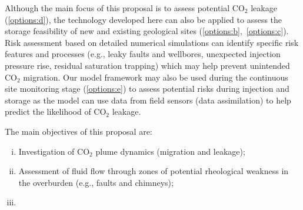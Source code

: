 \documentclass[12pts,a4paper,amsmath,amssymb,floatfix]{article}%
\newcommand{\CO}{CO\ensuremath{_{2}}}
\begin{document}
Although the main focus of this proposal is to assess potential \CO\; leakage (\ref{options:d}), the technology developed here can also be applied to assess the storage feasibility of new and existing geological sites (\ref{options:b},~\ref{options:c}).  Risk assessment based on detailed numerical simulations can identify specific risk features and processes (e.g., leaky faults and wellbores, unexpected injection pressure rise, residual saturation trapping) which may help prevent unintended \CO\; migration. Our model framework may also be used during the continuous site monitoring stage (\ref{options:e}) to assess potential risks during injection and storage as the model can use data from field sensors (data assimilation) to help predict the likelihood of \CO\; leakage.

The main objectives of this proposal are:
\begin{enumerate}[(i)]
%
   \item Investigation of \CO\; plume dynamics (migration and leakage);
%
   \item Assessment of fluid flow through zones of potential rheological weakness in the overburden (e.g., faults and chimneys);
%
   \item    
%
\end{enumerate}
\end{document}
